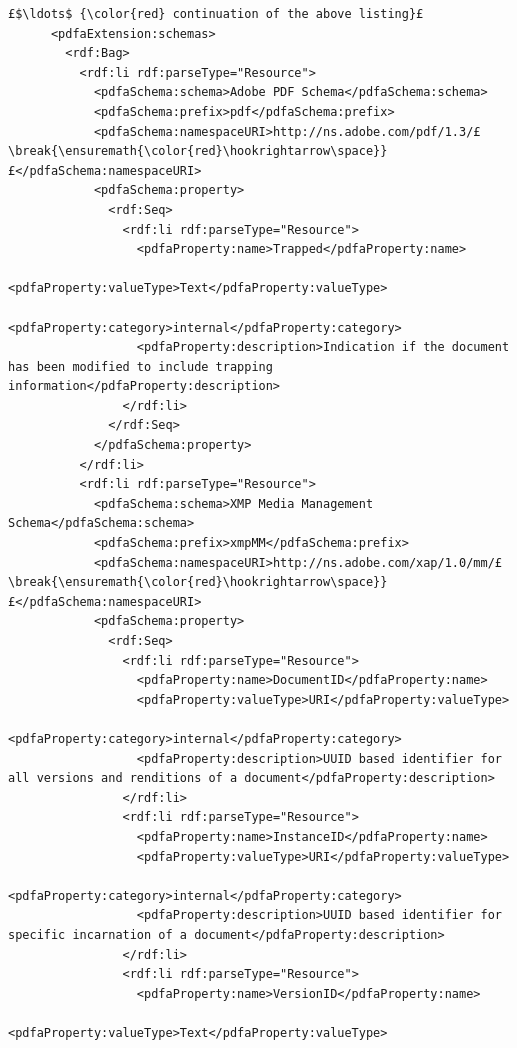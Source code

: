 \begin{lstlisting}[style=myXML,
caption={Second part of the XML metadata embedded in a PDF file (some reformatting has been done to fit the text in the boarders)}, label={lst:pdfinfoOutputPart2}]
£$\ldots$ {\color{red} continuation of the above listing}£ 
      <pdfaExtension:schemas>
        <rdf:Bag>
          <rdf:li rdf:parseType="Resource">
            <pdfaSchema:schema>Adobe PDF Schema</pdfaSchema:schema>
            <pdfaSchema:prefix>pdf</pdfaSchema:prefix>
            <pdfaSchema:namespaceURI>http://ns.adobe.com/pdf/1.3/£\break{\ensuremath{\color{red}\hookrightarrow\space}}£</pdfaSchema:namespaceURI>
            <pdfaSchema:property>
              <rdf:Seq>
                <rdf:li rdf:parseType="Resource">
                  <pdfaProperty:name>Trapped</pdfaProperty:name>
                  <pdfaProperty:valueType>Text</pdfaProperty:valueType>
                  <pdfaProperty:category>internal</pdfaProperty:category>
                  <pdfaProperty:description>Indication if the document has been modified to include trapping information</pdfaProperty:description>
                </rdf:li>
              </rdf:Seq>
            </pdfaSchema:property>
          </rdf:li>
          <rdf:li rdf:parseType="Resource">
            <pdfaSchema:schema>XMP Media Management Schema</pdfaSchema:schema>
            <pdfaSchema:prefix>xmpMM</pdfaSchema:prefix>
            <pdfaSchema:namespaceURI>http://ns.adobe.com/xap/1.0/mm/£\break{\ensuremath{\color{red}\hookrightarrow\space}}£</pdfaSchema:namespaceURI>
            <pdfaSchema:property>
              <rdf:Seq>
                <rdf:li rdf:parseType="Resource">
                  <pdfaProperty:name>DocumentID</pdfaProperty:name>
                  <pdfaProperty:valueType>URI</pdfaProperty:valueType>
                  <pdfaProperty:category>internal</pdfaProperty:category>
                  <pdfaProperty:description>UUID based identifier for all versions and renditions of a document</pdfaProperty:description>
                </rdf:li>
                <rdf:li rdf:parseType="Resource">
                  <pdfaProperty:name>InstanceID</pdfaProperty:name>
                  <pdfaProperty:valueType>URI</pdfaProperty:valueType>
                  <pdfaProperty:category>internal</pdfaProperty:category>
                  <pdfaProperty:description>UUID based identifier for specific incarnation of a document</pdfaProperty:description>
                </rdf:li>
                <rdf:li rdf:parseType="Resource">
                  <pdfaProperty:name>VersionID</pdfaProperty:name>
                  <pdfaProperty:valueType>Text</pdfaProperty:valueType>

\end{lstlisting}

